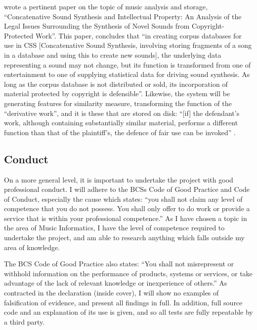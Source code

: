 \citet{Sturm2006} wrote a pertinent paper on the topic of music analysis and storage, ``Concatenative Sound Synthesis and Intellectual Property: An Analysis of the Legal Issues Surrounding the Synthesis of Novel Sounds from
Copyright-Protected Work''. This paper, concludes that
``in creating corpus databases for use in CSS [Concatenative Sound
Synthesis, involving storing fragments of a song in a database and
using this to create new sounds], the underlying data representing a
sound may not change, but its function is transformed from one of
entertainment to one of supplying statistical data for driving sound
synthesis. As long as the corpus database is not distributed or sold,
its incorporation of material protected by copyright is defensible''.
Likewise, the system will be generating features for similarity measure, transforming the function of the ``derivative work'', and it is these that are stored on disk: ``[if] the defendant's work, although containing
substantially similar material, performs a different function than that of the plaintiff's, the defence of fair use can be invoked'' \citep{Copyright1988}.
\subsection{Conduct}
On a more general level, it is important to undertake the project with good professional conduct. I will adhere to the BCSs Code of Good Practice and Code of Conduct, especially the cause which states: ``you shall not claim any level of competence that you do not possess. You shall only offer to do work or provide a service that is within your professional competence.''
As I have chosen a topic in the area of Music Informatics, I have the level of
competence required to undertake the project, and am able to research anything
which falls outside my area of knowledge.

The BCS Code of Good Practice also states: ``You shall not misrepresent or withhold information on the performance of products, systems or services, or take advantage of the lack of relevant knowledge or inexperience of others.'' As contracted in the declaration (inside cover), I will show no examples of falsification of evidence, and present all findings in full. In addition, full source code and an explanation of its use is given, and so all tests are fully repeatable by a third party.

